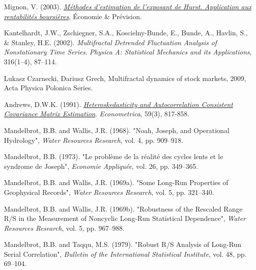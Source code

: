 \documentclass[11pt]{extarticle}
\begin{document}
Mignon, V. (2003). \textit{\href{https://www.persee.fr/doc/ecop_0249-4744_1998_num_132_1_5909}{Méthodes d'estimation de l'exposant de Hurst. Application aux rentabilités boursières}}, Économie \& Prévision.

Kantelhardt, J.W., Zschiegner, S.A., Koscielny-Bunde, E., Bunde, A., Havlin, S., \& Stanley, H.E. (2002). \textit{Multifractal Detrended Fluctuation Analysis of Nonstationary Time Series}. \textit{Physica A: Statistical Mechanics and its Applications}, 316(1--4), 87--114.

Lukasz Czarnecki, Dariusz Grech, Multifractal dynamics of stock markets, 2009, Acta Physica Polonica Series.


Andrews, D.W.K. (1991). \textit{\href{https://www.jstor.org/stable/2938229}{Heteroskedasticity and Autocorrelation Consistent Covariance Matrix Estimation}}. \textit{Econometrica}, 59(3), 817-858.

Mandelbrot, B.B. and Wallis, J.R. (1968). "Noah, Joseph, and Operational Hydrology", \textit{Water Resources Research}, vol. 4, pp. 909--918.

Mandelbrot, B.B. (1973). "Le problème de la réalité des cycles lents et le syndrome de Joseph", \textit{Economie Appliquée}, vol. 26, pp. 349--365.

Mandelbrot, B.B. and Wallis, J.R. (1969a). "Some Long-Run Properties of Geophysical Records", \textit{Water Resources Research}, vol. 5, pp. 321--340.

Mandelbrot, B.B. and Wallis, J.R. (1969b). "Robustness of the Rescaled Range R/S in the Measurement of Noncyclic Long-Run Statistical Dependence", \textit{Water Resources Research}, vol. 5, pp. 967--988.

Mandelbrot, B.B. and Taqqu, M.S. (1979). "Robust R/S Analysis of Long-Run Serial Correlation", \textit{Bulletin of the International Statistical Institute}, vol. 48, pp. 69--104.
\end{document}
